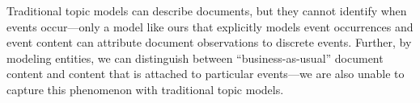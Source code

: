 Traditional topic models can describe documents, but they cannot identify when events occur---only a model like ours that explicitly models event occurrences and event content can attribute document observations to discrete events.  Further, by modeling entities, we can distinguish between ``business-as-usual'' document content and content that is attached to particular events---we are also unable to capture this phenomenon with traditional topic models.








